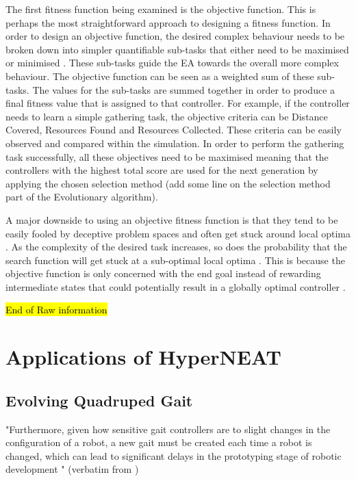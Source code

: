 \documentclass[conference]{IEEEtran}
\begin{document}
The first fitness function being examined is the objective
function. This is perhaps the most straightforward approach
to designing a fitness function.
In order to design an objective function, the desired complex behaviour needs to be broken down into simpler quantifiable sub-tasks that either need to be maximised
or minimised \cite{lehman2011abandoning}. These sub-tasks guide the EA towards
the overall more complex behaviour.
The objective function can be seen as a weighted sum of
these sub-tasks. The values for the sub-tasks are summed
together in order to produce a final fitness value that is assigned to that controller.
For example, if the controller needs to learn a simple gathering task, the objective criteria can be Distance Covered,
Resources Found and Resources Collected. These criteria can be easily observed and compared within the simulation. In order to perform the gathering task successfully, all these objectives need to be maximised meaning that the
controllers with the highest total score are used for the next generation by applying the chosen selection method (add some  line on the selection method part of the Evolutionary algorithm).

A major downside to using an objective fitness function
is that they tend to be easily fooled by deceptive problem
spaces and often get stuck around local optima \cite{lehman2011abandoning}.
As the complexity of the desired task increases, so does the probability that the search function will get stuck at a sub-optimal local optima \cite{FiciciPollack1998}.
This is because the objective function is only concerned with the end goal instead of rewarding intermediate states that could potentially result in a globally optimal controller \cite{lehman2011abandoning}.

\hl{End of Raw information}

\section{Applications of HyperNEAT}

\subsection{Evolving Quadruped Gait}
"Furthermore, given how sensitive gait controllers are to slight changes in the configuration of a robot, a new gait must be created each time a robot is changed, which can lead to significant delays in the prototyping stage of robotic development \cite{hornby2005autonomous}" (verbatim from \cite{clune2009evolving} )
\end{document}
